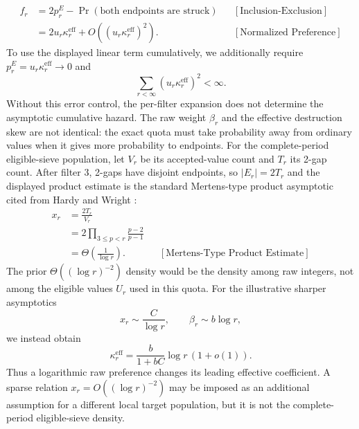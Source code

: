 \begin{equation*}
\begin{aligned}
f_r
&=2p_r^{E}-\Pr(\text{both endpoints are struck})
&&[\text{Inclusion-Exclusion}]\\
&=2u_r\kappa_r^{\mathrm{eff}}
+O\left((u_r\kappa_r^{\mathrm{eff}})^2\right).
&&[\text{Normalized Preference}]
\end{aligned}
\end{equation*}
To use the displayed linear term cumulatively, we additionally require $p_r^E=u_r\kappa_r^{\mathrm{eff}}\to0$ and
\begin{equation*}
\sum_{r<\infty}\left(u_r\kappa_r^{\mathrm{eff}}\right)^2<\infty.
\end{equation*}
Without this error control, the per-filter expansion does not determine the asymptotic cumulative hazard.
The raw weight $\beta_r$ and the effective destruction skew are not identical: the exact quota must take probability away from ordinary values when it gives more probability to endpoints. For the complete-period eligible-sieve population, let $V_r$ be its accepted-value count and $T_r$ its 2-gap count. After filter $3$, 2-gaps have disjoint endpoints, so $|E_r|=2T_r$ and the displayed product estimate is the standard Mertens-type product asymptotic cited from Hardy and Wright \cite{hardywright2008}:
\begin{equation*}
\begin{aligned}
x_r
&=\frac{2T_r}{V_r}\\
&=2\prod_{3\le p<r}\frac{p-2}{p-1}\\
&=\Theta\left(\frac1{\log r}\right).
&&[\text{Mertens-Type Product Estimate}]
\end{aligned}
\end{equation*}
The prior $\Theta((\log r)^{-2})$ density would be the density among raw integers, not among the eligible values $U_r$ used in this quota. For the illustrative sharper asymptotics
\begin{equation*}
x_r\sim\frac{C}{\log r},
\qquad
\beta_r\sim b\log r,
\end{equation*}
we instead obtain
\begin{equation*}
\kappa_r^{\mathrm{eff}}
=\frac{b}{1+bC}\log r\,(1+o(1)).
\end{equation*}
Thus a logarithmic raw preference changes its leading effective coefficient. A sparse relation $x_r=O((\log r)^{-2})$ may be imposed as an additional assumption for a different local target population, but it is not the complete-period eligible-sieve density.
